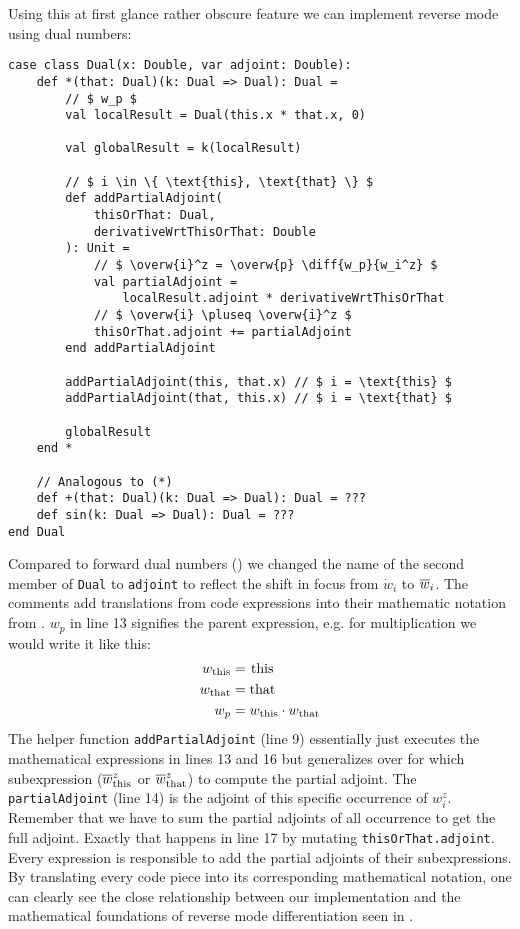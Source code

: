 Using this at first glance rather obscure feature we can implement reverse mode using dual numbers:
\begin{lstlisting}[mathescape=true, caption={Reverse mode CPS}, label={lst:cpsDual}]
case class Dual(x: Double, var adjoint: Double):
    def *(that: Dual)(k: Dual => Dual): Dual =
        // $ w_p $
        val localResult = Dual(this.x * that.x, 0)

        val globalResult = k(localResult)
        
        // $ i \in \{ \text{this}, \text{that} \} $
        def addPartialAdjoint(
            thisOrThat: Dual, 
            derivativeWrtThisOrThat: Double
        ): Unit =
            // $ \overw{i}^z = \overw{p} \diff{w_p}{w_i^z} $ 
            val partialAdjoint = 
                localResult.adjoint * derivativeWrtThisOrThat
            // $ \overw{i} \pluseq \overw{i}^z $
            thisOrThat.adjoint += partialAdjoint
        end addPartialAdjoint

        addPartialAdjoint(this, that.x) // $ i = \text{this} $
        addPartialAdjoint(that, this.x) // $ i = \text{that} $

        globalResult
    end *

    // Analogous to (*)
    def +(that: Dual)(k: Dual => Dual): Dual = ???
    def sin(k: Dual => Dual): Dual = ???
end Dual
\end{lstlisting}
Compared to forward dual numbers () we changed the name of the second member of \lstinline{Dual} to \lstinline{adjoint} to reflect the shift in focus from $\dot w_i$ to $\overline{w}_{i}$. The comments add translations from code expressions into their mathematic notation from . $w_p$ in line 13 signifies the parent expression, e.g. for multiplication we would write it like this:
\begin{align*}
    w_{\text{this}} &= \text{\lstinline{this}} \\
    w_{\text{that}} &= \text{\lstinline{that}} \\
    w_p &= w_{\text{this}} \cdot w_{\text{that}}
\end{align*}
The helper function \lstinline{addPartialAdjoint} (line 9) essentially just executes the mathematical expressions in lines 13 and 16 but generalizes over for which subexpression ($\overline{w}_{\text{this}}^z$ or $\overline{w}_{\text{that}}^z$) to compute the partial adjoint. The \lstinline{partialAdjoint} (line 14) is the adjoint of this specific occurrence of $ w_i^z $. Remember that we have to sum the partial adjoints of all occurrence to get the full adjoint. Exactly that happens in line 17 by mutating \lstinline{thisOrThat.adjoint}. Every expression is responsible to add the partial adjoints of their subexpressions. By translating every code piece into its corresponding mathematical notation, one can clearly see the close relationship between our implementation and the mathematical foundations of reverse mode differentiation seen in .

